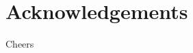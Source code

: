 \makeatletter
\renewcommand{\@chapapp}{}%
\newenvironment{chapquote}[2][2em]
{\setlength{\@tempdima}{#1}%
  \def\chapquote@author{#2}%
  \parshape 1 \@tempdima \dimexpr\textwidth-2\@tempdima\relax%
  \itshape}
{\par\normalfont\hfill--\ \chapquote@author\hspace*{\@tempdima}\par\bigskip}
\makeatother
\setcounter{footnote}{0}
\renewcommand{\BrainFuckChapter}{
  {-}{-}{-}{-}{[}{-}{-}{-}{-}{>}{+}{<}{]}{>}{+}{+}{.}{[}{-}{-}{-}{>}{+}{<}{]}{>}{-}{-}{-}{-}{.}{+}{+}{+}{+}{+}{+}{+}{+}{+}{+}{+}{.}{+}{+}{+}{[}{-}{>}{+}{+}{+}{<}{]}{>}{+}{+}{.}{+}{+}{+}{.}{+}{.}{-}{-}{.}{+}{+}{+}
  {+}{+}{+}{.}{+}{+}{+}{+}{.}{-}{-}{-}{-}{-}{-}{-}{-}{.}{+}{+}{+}{+}{+}{+}{+}{+}{+}{.}{+}{+}{+}{+}{+}{+}{.}{-}{-}{-}{-}{-}{.}{+}{+}{+}{+}{.}{[}{-}{-}{-}{>}{+}{<}{]}{-}{-}{-}{-}{+}{+}{+}{+}{+}{+}{+}{+}{+}{>}{>}{>}
}
\chapter*{Acknowledgements}
Cheers
